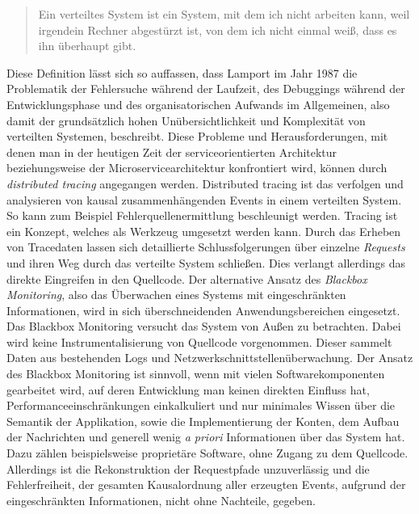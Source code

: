 \begin{quote}
	\cbstart
	Ein verteiltes System ist ein System, mit dem ich nicht arbeiten kann, weil irgendein Rechner abgestürzt ist, von dem ich nicht einmal weiß, dass es ihn überhaupt gibt.
	\cbend
\end{quote}


Diese Definition lässt sich so auffassen, dass Lamport im Jahr 1987 die Problematik der Fehlersuche während der Laufzeit, des Debuggings während der Entwicklungsphase und des organisatorischen Aufwands im Allgemeinen, also damit der grundsätzlich hohen Unübersichtlichkeit und Komplexität von verteilten Systemen, beschreibt. Diese Probleme und Herausforderungen, mit denen man in der heutigen Zeit der serviceorientierten Architektur beziehungsweise der Microservicearchitektur konfrontiert wird, können durch \emph{distributed tracing} angegangen werden. Distributed tracing ist das verfolgen und analysieren von kausal zusammenhängenden Events in einem verteilten System. So kann zum Beispiel Fehlerquellenermittlung beschleunigt werden. Tracing ist ein Konzept, welches als Werkzeug umgesetzt werden kann. Durch das Erheben von Tracedaten lassen sich detaillierte Schlussfolgerungen über einzelne \emph{Requests} und ihren Weg durch das verteilte System schließen. Dies verlangt allerdings das direkte Eingreifen in den Quellcode. Der alternative Ansatz des \emph{Blackbox Monitoring}, also das Überwachen eines Systems mit eingeschränkten Informationen, wird in sich überschneidenden Anwendungsbereichen eingesetzt. Das Blackbox Monitoring versucht das System von Außen zu betrachten. Dabei wird keine Instrumentalisierung von Quellcode vorgenommen. Dieser sammelt Daten aus bestehenden Logs und Netzwerkschnittstellenüberwachung. Der Ansatz des Blackbox Monitoring ist sinnvoll, wenn mit vielen Softwarekomponenten gearbeitet wird, auf deren Entwicklung man keinen direkten Einfluss hat, Performanceeinschränkungen einkalkuliert und nur minimales Wissen über die Semantik der Applikation, sowie die Implementierung der Konten, dem Aufbau der Nachrichten und generell wenig \emph{a priori} Informationen über das System hat. Dazu zählen beispielsweise proprietäre Software, ohne Zugang zu dem Quellcode. Allerdings ist die Rekonstruktion der Requestpfade unzuverlässig und die Fehlerfreiheit, der gesamten Kausalordnung aller erzeugten Events, aufgrund der eingeschränkten Informationen, nicht ohne Nachteile, gegeben. 

